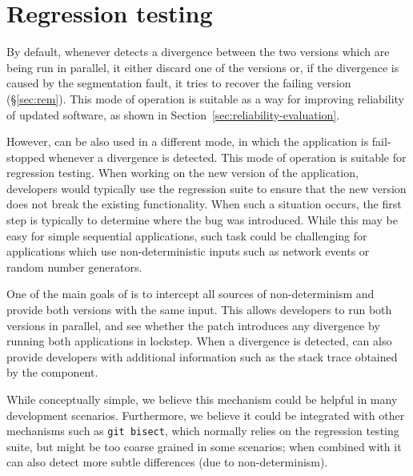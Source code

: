 \section{Regression testing}
\label{sec:testing}

By default, whenever \mx detects a divergence between the two versions which
are being run in parallel, it either discard one of the versions or, if the
divergence is caused by the segmentation fault, it tries to recover the failing
version (\S\ref{sec:rem}). This mode of operation is suitable as a way for
improving reliability of updated software, as shown in
Section~\ref{sec:reliability-evaluation}.

However, \mx can be also used in a different mode, in which the application is
fail-stopped whenever a divergence is detected. This mode of operation is
suitable for regression testing. When working on the new version of the
application, developers would typically use the regression suite to ensure that
the new version does not break the existing functionality. When such a situation
occurs, the first step is typically to determine where the bug was introduced.
While this may be easy for simple sequential applications, such task could be
challenging for applications which use non-deterministic inputs such as network
events or random number generators.

One of the main goals of \mx is to intercept all sources of non-determinism and
provide both versions with the same input. This allows developers to run both
versions in parallel, and see whether the patch introduces any divergence by
running both applications in lockstep. When a divergence is detected, \mx can
also provide developers with additional information such as the stack trace
obtained by the \rem component.

While conceptually simple, we believe this mechanism could be helpful in many
development scenarios. Furthermore, we believe it could be integrated with
other mechanisms such as \lstinline`git bisect`, which normally relies on the
regression testing suite, but might be too coarse grained in some scenarios;
when combined with \mx it can also detect more subtle differences (\eg due to
non-determinism).
